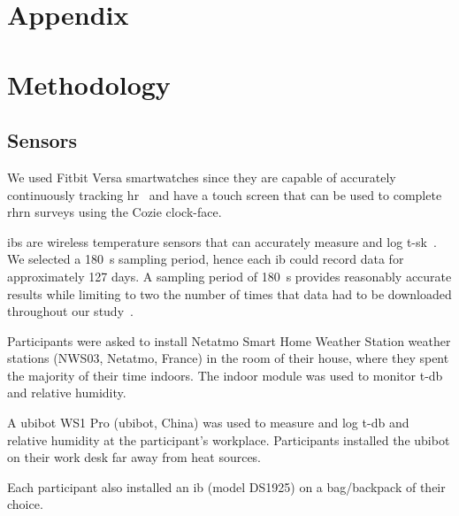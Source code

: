 \documentclass[]{article}
\begin{document}
\section{Appendix}

    

\appendix

\renewcommand\thefigure{\thesection.\arabic{figure}} 
\renewcommand\thetable{\thesection.\arabic{table}} 

\section{Methodology}\label{sec:methodology2}

\subsection{Sensors}\label{subsec:sensors}

We used Fitbit Versa smartwatches since they are capable of accurately continuously tracking \ac{hr}~\cite{Nelson2019} and have a touch screen that can be used to complete \ac{rhrn} surveys using the Cozie clock-face.

\glspl{ib} are wireless temperature sensors that can accurately measure and log \ac{t-sk}~\cite{VanMarkenLichtenbelt2006}.
We selected a 180~s sampling period, hence each \gls{ib} could record data for approximately 127 days.
A sampling period of 180~s provides reasonably accurate results while limiting to two the number of times that data had to be downloaded throughout our study~\cite{Tartarini2020d}.

Participants were asked to install Netatmo Smart Home Weather Station weather stations (NWS03, Netatmo, France) in the room of their house, where they spent the majority of their time indoors.
The indoor module was used to monitor \ac{t-db} and relative humidity.

A \gls{ubibot} WS1 Pro (\gls{ubibot}, China) was used to measure and log \ac{t-db} and relative humidity at the participant's workplace.
Participants installed the \gls{ubibot} on their work desk far away from heat sources.

Each participant also installed an \gls{ib} (model DS1925) on a bag/backpack of their choice.
\end{document}
